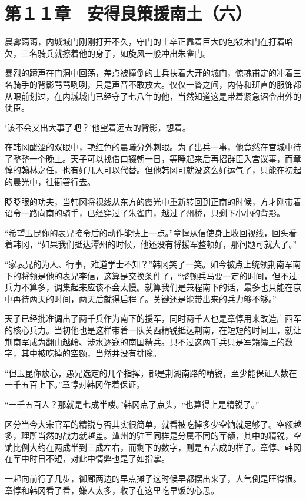 \section{第１１章　安得良策援南土（六）}

晨雾蔼蔼，内城城门刚刚打开不久，守门的士卒正靠着巨大的包铁木门在打着哈欠，三名骑兵就擦着他的身子，如旋风一般冲出朱雀门。

暴烈的蹄声在门洞中回荡，差点被撞倒的士兵扶着大开的城门，惊魂甫定的冲着三名骑手的背影骂骂咧咧，只是声音不敢放大。仅仅一瞥之间，内侍和班直的服饰都从眼前划过，在内城城门已经守了七八年的他，当然知道这是带着紧急诏令出外的使臣。

‘该不会又出大事了吧？’他望着远去的背影，想着。

在韩冈酸涩的双眼中，艳红色的晨曦分外刺眼。为了出兵一事，他竟然在宫城中待了整整一个晚上。天子可以找借口辍朝一日，等睡起来后再招群臣入宫议事，而章惇的翰林之任，也有好几人可以代替。但他韩冈可就没这么好运气了，只能在初起的晨光中，往衙署行去。

眨眨眼的功夫，当韩冈将视线从东方的霞光中重新转回到正南的时候，方才刚带着诏令一路向南的骑手，已经穿过了朱雀门，越过了州桥，只剩下小小的背影。

“希望玉昆你的表兄接令后的动作能快上一点。”章惇从信使身上收回视线，回头看着韩冈，“如果我们抵达潭州的时候，他还没有将援军整顿好，那问题可就大了。”

“家表兄的为人、行事，难道学士不知？”韩冈笑了一笑。如今被点上统领荆南军南下的将领是他的表兄李信，这算是交换条件了，“整顿兵马要一定的时间，但不过兵力不算多，调集起来应该不会太慢。就算我们是兼程南下的话，最多也只能在京中再待两天的时间，两天后就得启程了。关键还是能带出来的兵力够不够。”

天子已经批准调出了两千兵作为南下的援军，同时两千人也是章惇用来改造广西军的核心兵力。当初他也是这样带着一队关西精锐抵达荆南，在短短的时间里，就让荆南军成为翻山越岭、涉水逐寇的南国精兵。只不过这两千兵只是军籍簿上的数字，其中被吃掉的空额，当然并没有排除。

“但玉昆你放心，愚兄选定的几个指挥，都是荆湖南路的精锐，至少能保证人数在一千五百上下。”章惇对韩冈作着保证。

“一千五百人？那就是七成半喽。”韩冈点了点头，“也算得上是精锐了。”

区分当今大宋官军的精锐与否其实很简单，就看被吃掉多少空饷就足够了。空额越多，理所当然的战力就越差。潭州的驻军同样是分属不同的军额，其中的精锐，空饷比例大约在两成半到三成左右，而剩下的数字，则是五六成的样子。章惇、韩冈在军中时日不短，对此中情弊也是了如指掌。

一起向前行了几步，御廊两边的早点摊子这时候早都摆出来了，人气倒是旺得很。章惇和韩冈看了看，嫌人太多，收了在这里吃早饭的心思。

